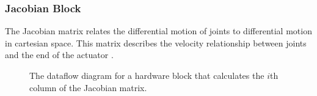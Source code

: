 \subsubsection{Jacobian Block}

The Jacobian matrix relates the differential motion of joints to differential 
motion in cartesian space. This matrix describes the velocity relationship between joints and the end of the actuator \cite{jacobian}.

\begin{figure}[ht]
\center
{}
\caption{The dataflow diagram for a hardware block that calculates the $i$th column of the Jacobian matrix.}
\label{fig:jacobian}
\end{figure}
